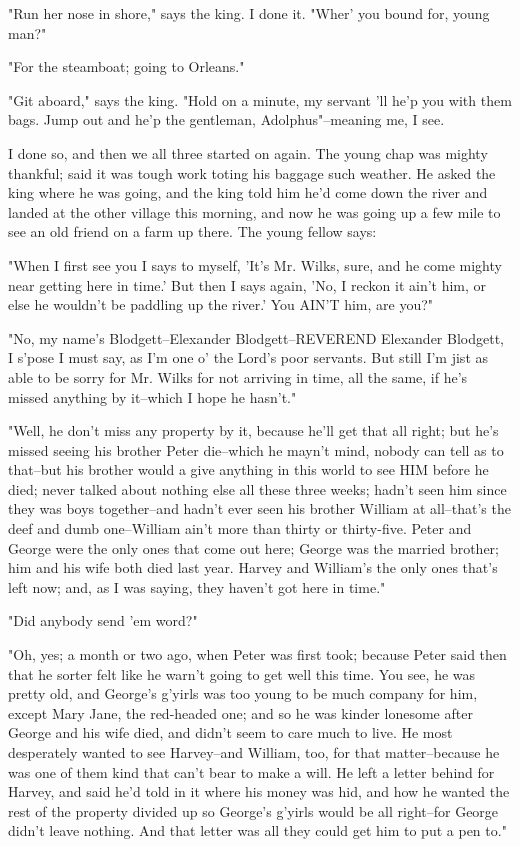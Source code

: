 "Run her nose in shore," says the king.  I done it.  "Wher' you bound
for, young man?"

"For the steamboat; going to Orleans."

"Git aboard," says the king.  "Hold on a minute, my servant 'll he'p you
with them bags.  Jump out and he'p the gentleman, Adolphus"--meaning me,
I see.

I done so, and then we all three started on again.  The young chap was
mighty thankful; said it was tough work toting his baggage such weather.
He asked the king where he was going, and the king told him he'd come
down the river and landed at the other village this morning, and now he
was going up a few mile to see an old friend on a farm up there.  The
young fellow says:

"When I first see you I says to myself, 'It's Mr. Wilks, sure, and he
come mighty near getting here in time.'  But then I says again, 'No, I
reckon it ain't him, or else he wouldn't be paddling up the river.'  You
AIN'T him, are you?"

"No, my name's Blodgett--Elexander Blodgett--REVEREND Elexander Blodgett,
I s'pose I must say, as I'm one o' the Lord's poor servants.  But still
I'm jist as able to be sorry for Mr. Wilks for not arriving in time, all
the same, if he's missed anything by it--which I hope he hasn't."

"Well, he don't miss any property by it, because he'll get that all
right; but he's missed seeing his brother Peter die--which he mayn't
mind, nobody can tell as to that--but his brother would a give anything
in this world to see HIM before he died; never talked about nothing else
all these three weeks; hadn't seen him since they was boys together--and
hadn't ever seen his brother William at all--that's the deef and dumb
one--William ain't more than thirty or thirty-five.  Peter and George
were the only ones that come out here; George was the married brother;
him and his wife both died last year.  Harvey and William's the only ones
that's left now; and, as I was saying, they haven't got here in time."

"Did anybody send 'em word?"

"Oh, yes; a month or two ago, when Peter was first took; because Peter
said then that he sorter felt like he warn't going to get well this time.
You see, he was pretty old, and George's g'yirls was too young to be much
company for him, except Mary Jane, the red-headed one; and so he was
kinder lonesome after George and his wife died, and didn't seem to care
much to live.  He most desperately wanted to see Harvey--and William,
too, for that matter--because he was one of them kind that can't bear to
make a will.  He left a letter behind for Harvey, and said he'd told in
it where his money was hid, and how he wanted the rest of the property
divided up so George's g'yirls would be all right--for George didn't
leave nothing.  And that letter was all they could get him to put a pen
to."

